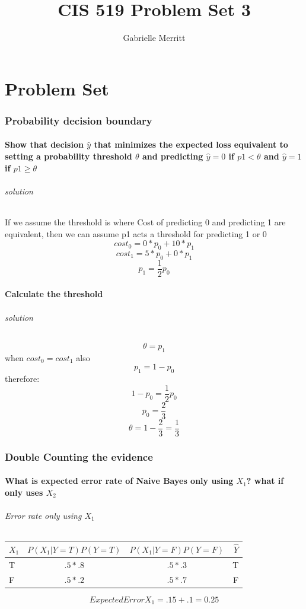 \documentclass{article}
\title{CIS 519 Problem Set 3}
\author{Gabrielle Merritt}
\begin{document}
\maketitle
\part{Problem Set}

\section{Probability decision boundary}

\subsection{Show that decision $\hat{y}$ that minimizes the expected loss equivalent to setting a probability threshold $\theta$ and predicting $ \hat{y} = 0$  if $p1<\theta$ and $\hat{y} = 1$ if $p1 \geq \theta$}
\paragraph{solution}
If we assume the threshold is where Cost of predicting 0 and predicting 1 are equivalent, then we can assume p1 acts a threshold for predicting 1 or 0 
$$cost_0 = 0*p_0 + 10*p_1 $$
$$cost_1 = 5*p_0 + 0*p_1 $$
$$p_1 = \frac{1}{2}p_0 $$  

\subsection{Calculate the threshold}
\paragraph{solution}
$$\theta = p_1 $$ when  $cost_0 = cost_1 $
also 
$$p_1 = 1 - p_0$$
therefore: 
$$ 1 - p_0 = \frac{1}{2}p_0 $$ 
$$ p_0 = \frac{2}{3} $$
$$ \theta = 1 - \frac{2}{3} = \frac{1}{3} $$ 


\section{Double Counting the evidence}
\subsection{What is expected error rate of Naive Bayes only using $X_1$? what if only uses $X_2$}
\paragraph{Error rate only using $X_1$}
\begin{tabular}{l*{2}{c}||r}
$X_1$              & $P(X_1|Y =T)P( Y =T)$ &$P(X_1|Y =F)P( Y =F) $ & $\hat{Y}$ \\
\hline
T & $.5 *.8 $& $.5*.3$  & T   \\
F & $.5* .2$ & $.5 * .7$  &  F  \\
\end{tabular}
\linebreak
$$Expected Error X_1 = .15 +.1 =0.25 $$ 
\end{document}
